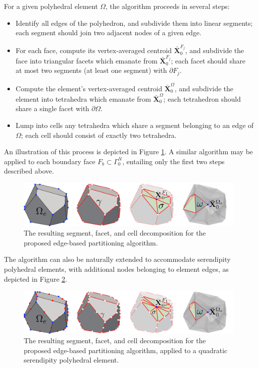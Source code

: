	For a given polyhedral element $\Omega$, the algorithm proceeds in several steps:
	\begin{itemize}
		\item[1.)] Identify all edges of the polyhedron, and subdivide them into linear segments; each segment should join two adjacent nodes of a given edge.
		\item[2.)] For each face, compute its vertex-averaged centroid $\bar{\mathbf{X}}^{F_j}_0$, and subdivide the face into triangular facets which emanate from $\bar{\mathbf{X}}^{F_j}_0$; each facet should share at most two segments (at least one segment) with $\partial F_j$.
		\item[3a.)] Compute the element's vertex-averaged centroid $\bar{\mathbf{X}}^{\Omega}_0$, and subdivide the element into tetrahedra which emanate from $\bar{\mathbf{X}}^{\Omega}_0$; each tetrahedron should share a single facet with $\partial \Omega$.
		\item[3b.)] Lump into cells any tetrahedra which share a segment belonging to an edge of $\Omega$; each cell should consist of exactly two tetrahedra.
	\end{itemize}
	An illustration of this process is depicted in Figure \ref{fig:partitioning_algorithm}. A similar algorithm may be applied to each boundary face $F_b \subset \Gamma^N_0$, entailing only the first two steps described above.
	\begin{figure} [!ht]
		\centering
		\includegraphics[width = 6.0in]{figures/partitioning_algorithm.pdf}
		\caption{The resulting segment, facet, and cell decomposition for the proposed edge-based partitioning algorithm.}
		\label{fig:partitioning_algorithm}
	\end{figure}
	
	The algorithm can also be naturally extended to accommodate serendipity polyhedral elements, with additional nodes belonging to element edges, as depicted in Figure \ref{fig:partitioning_algorithm_quadratic}.
	\begin{figure} [!ht]
		\centering
		\includegraphics[width = 6.0in]{figures/partitioning_algorithm_quadratic.pdf}
		\caption{The resulting segment, facet, and cell decomposition for the proposed edge-based partitioning algorithm, applied to a quadratic serendipity polyhedral element.}
		\label{fig:partitioning_algorithm_quadratic}
	\end{figure}
	
